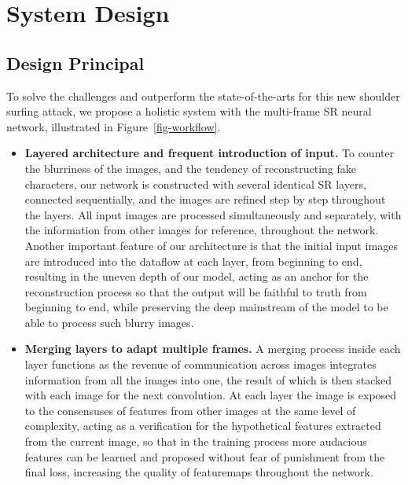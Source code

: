 \section{System Design}
\label{sec-design}

\subsection{Design Principal}
To solve the challenges and outperform the state-of-the-arts for this new shoulder surfing attack, we propose a holistic system with the multi-frame SR neural network, illustrated in Figure~\ref{fig-workflow}.

\begin{itemize}
    \item \textbf{Layered architecture and frequent introduction of input.} To counter the blurriness of the images, and the tendency of reconstructing fake characters, our network is constructed with several identical SR layers, connected sequentially, and the images are refined step by step throughout the layers. All input images are processed simultaneously and separately, with the information from other images for reference, throughout the network. Another important feature of our architecture is that the initial input images are introduced into the dataflow at each layer, from beginning to end, resulting in the uneven depth of our model, acting as an anchor for the reconstruction process so that the output will be faithful to truth from beginning to end, while preserving the deep mainstream of the model to be able to process such blurry images.
    \item \textbf{Merging layers to adapt multiple frames.} A merging process inside each layer functions as the revenue of communication across images integrates information from all the images into one, the result of which is then stacked with each image for the next convolution. At each layer the image is exposed to the consensuses of features from other images at the same level of complexity, acting as a verification for the hypothetical features extracted from the current image, so that in the training process more audacious features can be learned and proposed without fear of punishment from the final loss, increasing the quality of featuremaps throughout the network.

\end{itemize}
